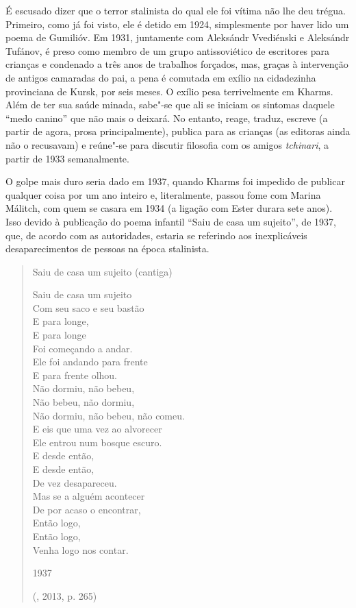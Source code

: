 É escusado dizer que o terror stalinista do qual ele foi vítima
não lhe deu trégua. Primeiro, como já foi visto, ele é detido em
1924, simplesmente por haver lido um poema de Gumilióv. Em 1931,
juntamente com Aleksándr Vvediénski e Aleksándr Tufánov, é preso
como membro de um grupo antissoviético de escritores para crianças
e condenado a três anos de trabalhos forçados, mas, graças à
intervenção de antigos camaradas do pai, a pena é comutada em
exílio na cidadezinha provinciana de Kursk, por seis meses. O
exílio pesa terrivelmente em Kharms. Além de ter sua saúde minada,
sabe"-se que ali se iniciam os sintomas daquele ``medo canino'' que
não mais o deixará. No entanto, reage, traduz, escreve (a partir de
agora, prosa principalmente), publica para as crianças (as editoras
ainda não o recusavam) e reúne"-se para discutir filosofia com os
amigos \emph{tchinari}, a partir de 1933 semanalmente.

O golpe mais duro seria dado em 1937, quando Kharms foi impedido de publicar qualquer coisa por um ano inteiro e, literalmente, passou fome com Marina Málitch, com quem se casara em 1934 (a ligação com Ester durara sete anos). Isso devido à publicação do poema infantil ``Saiu de casa um sujeito'', de 1937, que, de acordo com as autoridades, estaria se referindo aos inexplicáveis desaparecimentos de pessoas na época stalinista. 

\begin{verse}
Saiu de casa um sujeito
(cantiga)

Saiu de casa um sujeito\\
Com seu saco e seu bastão\\
E para longe,\\
E para longe\\
Foi começando a andar.\\[8pt]
Ele foi andando para frente\\
E para frente olhou.\\
Não dormiu, não bebeu,\\
Não bebeu, não dormiu,\\
Não dormiu, não bebeu, não comeu.\\[8pt]
E eis que uma vez ao alvorecer\\
Ele entrou num bosque escuro.\\
E desde então, \\
E desde então,\\
De vez desapareceu.\\[8pt]
Mas se a alguém acontecer\\
De por acaso o encontrar,\\
Então logo,\\
Então logo,\\
Venha logo nos contar.

1937

(, 2013, p. 265)

\end{verse}

